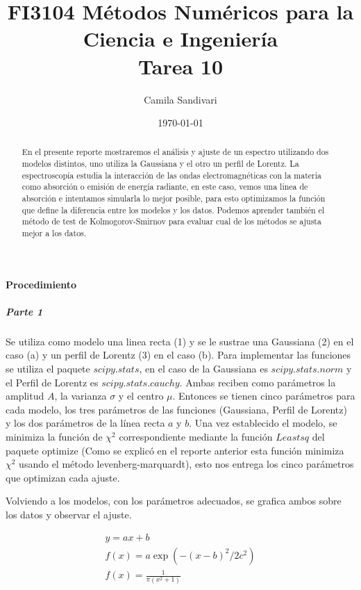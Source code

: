 \documentclass[prl,showpacs, twocolumn]{revtex4-1}
\begin{document}
\title{FI3104 M\'etodos Num\'ericos para la Ciencia e Ingenier\'ia\\ Tarea 10}
\author{Camila Sandivari}
\date{\today}

\begin{abstract}
En el presente reporte mostraremos el an\'alisis y ajuste de un espectro utilizando dos modelos distintos, uno utiliza la Gaussiana y el otro un perfil de Lorentz. La espectroscop\'ia estudia la interacci\'on de las ondas electromagn\'eticas con la materia como absorci\'on o emisi\'on de energ\'ia radiante, en este caso, vemos una linea de absorci\'on e intentamos simularla lo mejor posible, para esto optimizamos la funci\'on que define la diferencia entre los modelos y los datos. Podemos aprender tambi\'en el m\'etodo de test de Kolmogorov-Smirnov para evaluar cual de los m\'etodos se ajusta mejor a los datos.
\end{abstract}
\maketitle

\paragraph{Procedimiento}
\subparagraph{Parte 1}

Se utiliza como modelo una linea recta (1) y se le sustrae una Gaussiana (2) en el caso (a) y un perfil de Lorentz (3) en el caso (b). Para implementar las funciones se utiliza el paquete $scipy.stats$, en el caso de la Gaussiana es $scipy.stats.norm$ y el Perfil de Lorentz es $scipy.stats.cauchy$. Ambas reciben como par\'ametros la amplitud $A$, la varianza $\sigma$ y el centro $\mu$.  Entonces se tienen cinco par\'ametros para cada modelo, los tres par\'ametros de las funciones (Gaussiana, Perfil de Lorentz) y los dos par\'ametros de la l\'inea recta $a$ y $b$. Una vez establecido el modelo, se minimiza la funci\'on de $\chi^2$ correspondiente mediante la funci\'on $Leastsq$ del paquete optimize (Como se explic\'o en el reporte anterior esta funci\'on minimiza $\chi^2$ usando el m\'etodo levenberg-marquardt), esto nos entrega los cinco par\'ametros que optimizan cada ajuste.

Volviendo a los modelos, con los par\'ametros adecuados, se grafica ambos sobre los datos y observar el ajuste.

\begin{center}
\begin{eqnarray}
y= a x +b\\
f(x) = a\exp (-(x-b)^{2}/2c^{2}) \\
f(x)= \frac{1}{\pi(x^{2}+1)}
\end{eqnarray}
\end{center}
\end{document}
